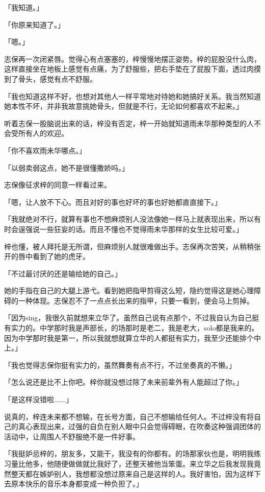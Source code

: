 \documentclass[UTF8]{ctexart}
\begin{document}
    「我知道。」

    「你原来知道了。」

    「嗯。」

    志保再一次闭紧唇。觉得心有点塞塞的，梓慢慢地摆正姿势。梓的屁股没什么肉，这样直接坐在地板上感觉有点痛，为了舒服些，把右手垫在了屁股下面，透过肉摸到了骨头，感觉有点不舒服。

    「我也知道这样不好，也想对其他人一样平常地对待她和她搞好关系。我当然知道她本性不坏，并非我故意挑她骨头，但就是不行，无论如何都喜欢不起来。」

    听着志保一股脑说出来的话，梓没有否定，梓一开始就知道雨未华那种类型的人不会受所有人的欢迎。

    「你不喜欢雨未华哪点。」

    「以弱卖弱这点，她不是很懂撒娇吗。」

    志保像征求梓的同意一样看过来。

    「嗯，让人放不下心。而且对好的事也好坏的事也好她都直直接下。」

    「我就绝对不行，就算有事也不想麻烦别人没法像她一样马上就表现出来，所以有时会逞强说一些狂妄的话。而且不懂也不觉得雨未华那样的女生比较可爱。」

    梓也懂，被人拜托是无所谓，但麻烦别人就很难做出手。志保再次苦笑，从稍稍张开的唇中看到了她的虎牙。

    「不过最讨厌的还是输给她的自己。」

    她的手指在自己的大腿上游弋。看到她把指甲剪得这么短，隐约觉得这是她心理障碍的一种体现。志保忍不了一点点长出来的指甲，只要一看到，便会马上剪掉。

    「因为sing，我很久前就想来立华了。虽然自己说有点那个，不过我自认为自己挺有实力的。中学那时我是声部长，的场那时是老二，我是老大，solo都是我来的。因为中学那时我是第一，所以我就想就算立华的人都挺有实力，我至少还能排个中上。」

    「我也觉得志保你挺有实力的，虽然舞奏有点不行，不过坐奏真的不懒。」

    「怎么说还是比不上你吧。梓你就没想过除了未来前辈外有人能超过了你。」

    「是这样没错啦......」

    说真的，梓连未来都不想输，在长号方面，自己不想输给任何人。不过梓没有将自己的真心表现出来，过强的自负在别人眼中只会觉得碍眼，在吹奏这种强调团体的活动中，让周围人不舒服绝不是一件好事。

    「我挺妒忌梓的，朋友多，又能干，我没有的你都有。的场那家伙也是，明明我练习量比他多，他随便做做就比我好了，还整天被他当笨蛋。来立华之后我发现我竟然整天都在嫉妒别人，我想都没想过原来自己是这样的人。我好害怕，因为这样下去原本快乐的音乐本身都变成一种负担了。」
\end{document}
